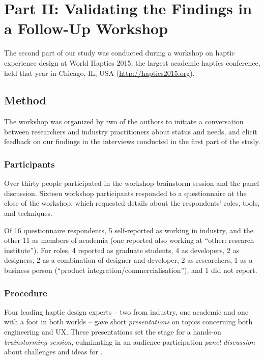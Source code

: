 \section{Part II: Validating the Findings in a Follow-Up Workshop}
\label{sec:workshop}
\noindent
The second part of our study was conducted during a workshop on haptic experience design at World Haptics 2015, the largest academic haptics conference, held that year in Chicago, IL, USA %
(\url{http://haptics2015.org}).

\subsection{Method}
\noindent
The workshop was organized by two of the authors %
to initiate a conversation between researchers and industry practitioners about \haxd status and needs, and elicit feedback on our findings in the interviews conducted in the first part of the study.

\subsubsection{Participants}
\noindent
Over thirty people participated in the workshop brainstorm session and the panel discussion.
Sixteen workshop participants responded to a questionnaire at the close of the workshop, which requested details about the respondents' roles, tools, and techniques. %

Of 16 questionnaire respondents, 5 self-reported as working in industry, and the other 11 as members of academia (one  reported also working at ``other: research institute'').
For roles, 4 reported as graduate students, 4 as developers, 2 as designers, 2 as a combination of designer and developer, 2 as researchers, 1 as a business person (``product integration/commercialisation''), and 1 did not report.

\subsubsection{Procedure}
\noindent
Four leading haptic design experts -- two from industry, one academic and one with a foot in both worlds -- gave short \emph{presentations} on topics concerning both engineering and UX.
These presentations set the stage for a hands-on \emph{brainstorming session}, culminating in an audience-participation \emph{panel discussion} about challenges and ideas for \haxd. 

